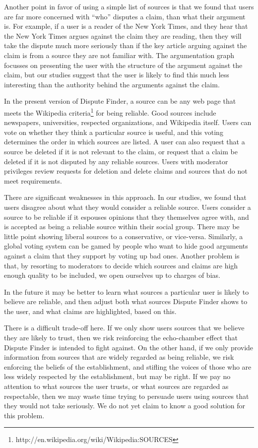 \documentclass{www2010-submission}
\newcommand{\todo}[1]{}
\begin{document}
Another point in favor of using a simple list of sources is that we found that users are far more concerned with ``who'' disputes a claim, than what their argument is. For example, if a user is a reader of the New York Times, and they hear that the New York Times argues against the claim they are reading, then they will take the dispute much more seriously than if the key article arguing against the claim is from a source they are not familiar with. The argumentation graph focusses on presenting the user with the structure of the argument against the claim, but our studies suggest that the user is likely to find this much less interesting than the authority behind the arguments against the claim. 

In the present version of Dispute Finder, a source can be any web page that meets the Wikipedia criteria\footnote{http://en.wikipedia.org/wiki/Wikipedia:SOURCES} for being reliable. Good sources include newspapers, universities, respected organizations, and Wikipedia itself. Users can vote on whether they think a particular source is useful, and this voting determines the order in which sources are listed. A user can also request that a source be deleted if it is not relevant to the claim, or request that a claim be deleted if it is not disputed by any reliable sources. Users with moderator privileges review requests for deletion and delete claims and sources that do not meet requirements.

\todo{study result: verify}
There are significant weaknesses in this approach. In our studies, we found that users disagree about what they would consider a reliable source. Users consider a source to be reliable if it espouses opinions that they themselves agree with, and is accepted as being a reliable source within their social group. There may be little point showing liberal sources to a conservative, or vice-versa. Similarly, a global voting system can be gamed by people who want to hide good arguments against a claim that they support by voting up bad ones. Another problem is that, by resorting to moderators to decide which sources and claims are high enough quality to be included, we open ourselves up to charges of bias.

In the future it may be better to learn what sources a particular user is likely to believe are reliable, and then adjust both what sources Dispute Finder shows to the user, and what claims are highlighted, based on this.

There is a difficult trade-off here. If we only show users sources that we believe they are likely to trust, then we risk reinforcing the echo-chamber effect that Dispute Finder is intended to fight against. On the other hand, if we only provide information from sources that are widely regarded as being reliable, we risk enforcing the beliefs of the establishment, and stifling the voices of those who are less widely respected by the establishment, but may be right. If we pay no attention to what sources the user trusts, or what sources are regarded as respectable, then we may waste time trying to persuade users using sources that they would not take seriously. We do not yet claim to know a good solution for this problem.
\end{document}
